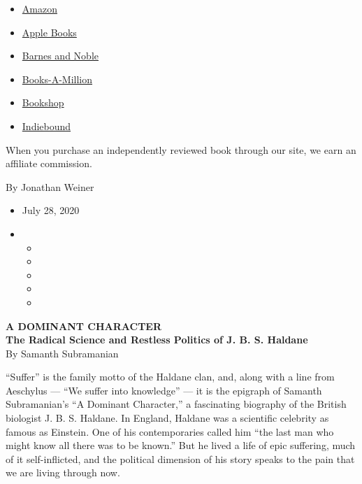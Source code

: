 \begin{itemize}
\tightlist
\item
  \href{https://www.amazon.com/gp/search?index=books\&tag=NYTBSREV-20\&field-keywords=A+Dominant+Character\%3A+The+Radical+Science+and+Restless+Politics+of+J.B.S.+Haldane+Samanth+Subramanian}{Amazon}
\item
  \href{https://du-gae-books-dot-nyt-du-prd.appspot.com/buy?title=A+Dominant+Character\%3A+The+Radical+Science+and+Restless+Politics+of+J.B.S.+Haldane\&author=Samanth+Subramanian}{Apple
  Books}
\item
  \href{https://www.anrdoezrs.net/click-7990613-11819508?url=https\%3A\%2F\%2Fwww.barnesandnoble.com\%2Fw\%2F\%3Fean\%3D9780393634242}{Barnes
  and Noble}
\item
  \href{https://www.anrdoezrs.net/click-7990613-35140?url=https\%3A\%2F\%2Fwww.booksamillion.com\%2Fp\%2FA\%2BDominant\%2BCharacter\%253A\%2BThe\%2BRadical\%2BScience\%2Band\%2BRestless\%2BPolitics\%2Bof\%2BJ.B.S.\%2BHaldane\%2FSamanth\%2BSubramanian\%2F9780393634242}{Books-A-Million}
\item
  \href{https://bookshop.org/a/3546/9780393634242}{Bookshop}
\item
  \href{https://www.indiebound.org/book/9780393634242?aff=NYT}{Indiebound}
\end{itemize}

When you purchase an independently reviewed book through our site, we
earn an affiliate commission.

By Jonathan Weiner

\begin{itemize}
\item
  July 28, 2020
\item
  \begin{itemize}
  \item
  \item
  \item
  \item
  \item
  \end{itemize}
\end{itemize}

\textbf{A DOMINANT CHARACTER}\\
\textbf{The Radical Science and Restless Politics of J. B. S. Haldane}\\
By Samanth Subramanian

``Suffer'' is the family motto of the Haldane clan, and, along with a
line from Aeschylus --- ``We suffer into knowledge'' --- it is the
epigraph of Samanth Subramanian's ``A Dominant Character,'' a
fascinating biography of the British biologist J. B. S. Haldane. In
England, Haldane was a scientific celebrity as famous as Einstein. One
of his contemporaries called him ``the last man who might know all there
was to be known.'' But he lived a life of epic suffering, much of it
self-inflicted, and the political dimension of his story speaks to the
pain that we are living through now.

